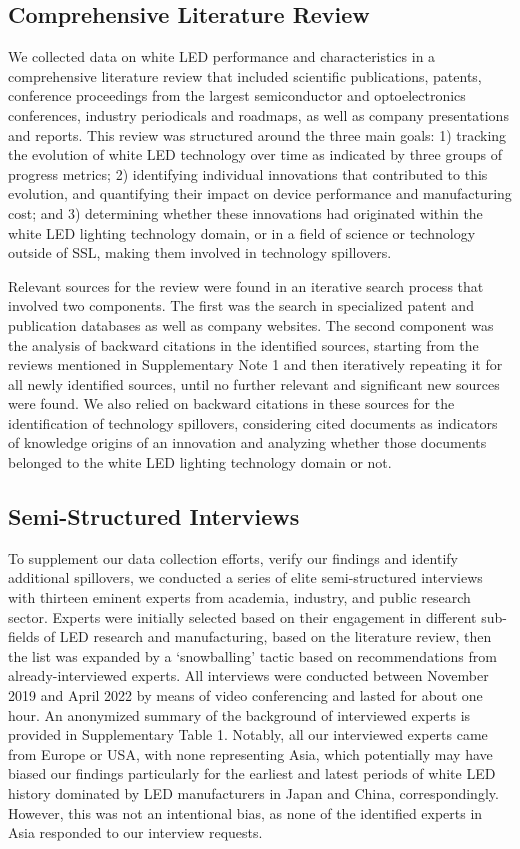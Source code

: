 \documentclass[parskip=full]{article}
\begin{document}
\subsection{Comprehensive Literature Review}

We collected data on white LED performance and characteristics in a comprehensive literature review that included scientific publications, patents, conference proceedings from the largest semiconductor and optoelectronics conferences, industry periodicals and roadmaps, as well as company presentations and reports. This review was structured around the three main goals: 1) tracking the evolution of white LED technology over time as indicated by three groups of progress metrics; 2) identifying individual innovations that contributed to this evolution, and quantifying their impact on device performance and manufacturing cost; and 3) determining whether these innovations had originated within the white LED lighting technology domain, or in a field of science or technology outside of SSL, making them involved in technology spillovers.

Relevant sources for the review were found in an iterative search process that involved two components. The first was the search in specialized patent and publication databases as well as company websites. The second component was the analysis of backward citations in the identified sources, starting from the reviews mentioned in Supplementary Note 1 and then iteratively repeating it for all newly identified sources, until no further relevant and significant new sources were found. We also relied on backward citations in these sources for the identification of technology spillovers, considering cited documents as indicators of knowledge origins of an innovation and analyzing whether those documents belonged to the white LED lighting technology domain or not.

\subsection{Semi-Structured Interviews}

To supplement our data collection efforts, verify our findings and identify additional spillovers, we conducted a series of elite semi-structured interviews \cite{tansey2009process} with thirteen eminent experts from academia, industry, and public research sector. Experts were initially selected based on their engagement in different sub-fields of LED research and manufacturing, based on the literature review, then the list was expanded by a ‘snowballing’ tactic based on recommendations from already-interviewed experts. All interviews were conducted between November 2019 and April 2022 by means of video conferencing and lasted for about one hour. An anonymized summary of the background of interviewed experts is provided in Supplementary Table 1. Notably, all our interviewed experts came from Europe or USA, with none representing Asia, which potentially may have biased our findings particularly for the earliest and latest periods of white LED history dominated by LED manufacturers in Japan and China, correspondingly. However, this was not an intentional bias, as none of the identified experts in Asia responded to our interview requests. 
\end{document}
